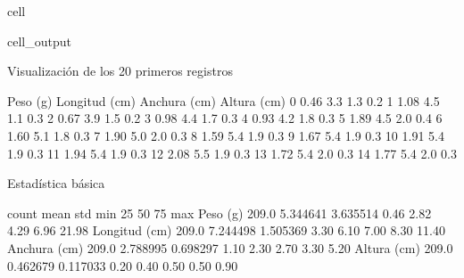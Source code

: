 \documentclass[a4paper,10pt,spanish]{jupyterBook}
\begin{document}
\begin{sphinxuseclass}{cell}
\begin{sphinxVerbatimOutput}
\begin{sphinxuseclass}{cell_output}
\begin{sphinxVerbatim}[commandchars=\\\{\}]
 Visualización de los 20 primeros registros
\end{sphinxVerbatim}

\begin{sphinxVerbatim}[commandchars=\\\{\}]
    Peso (g)  Longitud (cm)  Anchura (cm)  Altura (cm)
0       0.46            3.3           1.3          0.2
1       1.08            4.5           1.1          0.3
2       0.67            3.9           1.5          0.2
3       0.98            4.4           1.7          0.3
4       0.93            4.2           1.8          0.3
5       1.89            4.5           2.0          0.4
6       1.60            5.1           1.8          0.3
7       1.90            5.0           2.0          0.3
8       1.59            5.4           1.9          0.3
9       1.67            5.4           1.9          0.3
10      1.91            5.4           1.9          0.3
11      1.94            5.4           1.9          0.3
12      2.08            5.5           1.9          0.3
13      1.72            5.4           2.0          0.3
14      1.77            5.4           2.0          0.3
\end{sphinxVerbatim}

\begin{sphinxVerbatim}[commandchars=\\\{\}]
 Estadística básica
\end{sphinxVerbatim}

\begin{sphinxVerbatim}[commandchars=\\\{\}]
               count      mean       std   min   25\PYGZpc{}   50\PYGZpc{}   75\PYGZpc{}    max
Peso (g)       209.0  5.344641  3.635514  0.46  2.82  4.29  6.96  21.98
Longitud (cm)  209.0  7.244498  1.505369  3.30  6.10  7.00  8.30  11.40
Anchura (cm)   209.0  2.788995  0.698297  1.10  2.30  2.70  3.30   5.20
Altura (cm)    209.0  0.462679  0.117033  0.20  0.40  0.50  0.50   0.90
\end{sphinxVerbatim}

\end{sphinxuseclass}\end{sphinxVerbatimOutput}

\end{sphinxuseclass}
\end{document}
